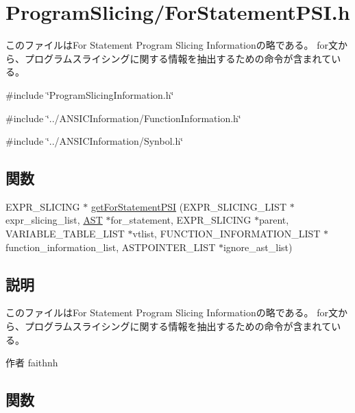 \section{ProgramSlicing/ForStatementPSI.h}
\label{ForStatementPSI_8h}


このファイルはFor Statement Program Slicing Informationの略である。 for文から、プログラムスライシングに関する情報を抽出するための命令が含まれている。  


{\ttfamily \#include \char`\"{}ProgramSlicingInformation.h\char`\"{}}\par
{\ttfamily \#include \char`\"{}../ANSICInformation/FunctionInformation.h\char`\"{}}\par
{\ttfamily \#include \char`\"{}../ANSICInformation/Synbol.h\char`\"{}}\par
\subsection*{関数}
\begin{DoxyCompactItemize}
\item 
EXPR\_\-SLICING $\ast$ \hyperlink{ForStatementPSI_8h_abd77ac4230aa652fe63fccc6dd3a7558}{getForStatementPSI} (EXPR\_\-SLICING\_\-LIST $\ast$expr\_\-slicing\_\-list, \hyperlink{structabstract__syntax__tree}{AST} $\ast$for\_\-statement, EXPR\_\-SLICING $\ast$parent, VARIABLE\_\-TABLE\_\-LIST $\ast$vtlist, FUNCTION\_\-INFORMATION\_\-LIST $\ast$function\_\-information\_\-list, ASTPOINTER\_\-LIST $\ast$ignore\_\-ast\_\-list)
\end{DoxyCompactItemize}


\subsection{説明}
このファイルはFor Statement Program Slicing Informationの略である。 for文から、プログラムスライシングに関する情報を抽出するための命令が含まれている。 \begin{DoxyAuthor}{作者}
faithnh 
\end{DoxyAuthor}


\subsection{関数}
